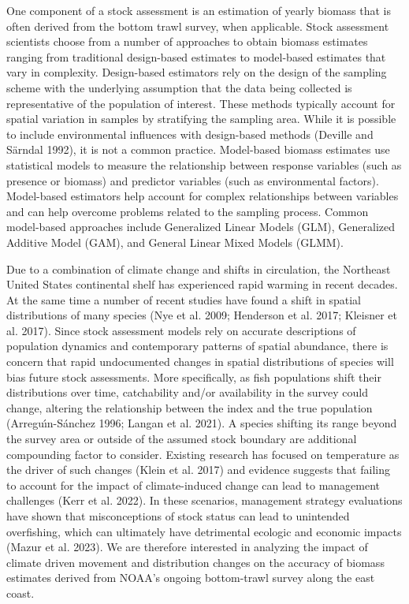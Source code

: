 \documentclass[
  12pt,
]{article}
\begin{document}
One component of a stock assessment is an estimation of yearly biomass that is often derived from the bottom trawl survey, when applicable. Stock assessment scientists choose from a number of approaches to obtain biomass estimates ranging from traditional design-based estimates to model-based estimates that vary in complexity. Design-based estimators rely on the design of the sampling scheme with the underlying assumption that the data being collected is representative of the population of interest. These methods typically account for spatial variation in samples by stratifying the sampling area. While it is possible to include environmental influences with design-based methods (Deville and Särndal 1992), it is not a common practice. Model-based biomass estimates use statistical models to measure the relationship between response variables (such as presence or biomass) and predictor variables (such as environmental factors). Model-based estimators help account for complex relationships between variables and can help overcome problems related to the sampling process. Common model-based approaches include Generalized Linear Models (GLM), Generalized Additive Model (GAM), and General Linear Mixed Models (GLMM).

Due to a combination of climate change and shifts in circulation, the Northeast United States continental shelf has experienced rapid warming in recent decades. At the same time a number of recent studies have found a shift in spatial distributions of many species (Nye et al. 2009; Henderson et al. 2017; Kleisner et al. 2017). Since stock assessment models rely on accurate descriptions of population dynamics and contemporary patterns of spatial abundance, there is concern that rapid undocumented changes in spatial distributions of species will bias future stock assessments. More specifically, as fish populations shift their distributions over time, catchability and/or availability in the survey could change, altering the relationship between the index and the true population (Arreguı́n-Sánchez 1996; Langan et al. 2021). A species shifting its range beyond the survey area or outside of the assumed stock boundary are additional compounding factor to consider. Existing research has focused on temperature as the driver of such changes (Klein et al. 2017) and evidence suggests that failing to account for the impact of climate-induced change can lead to management challenges (Kerr et al. 2022). In these scenarios, management strategy evaluations have shown that misconceptions of stock status can lead to unintended overfishing, which can ultimately have detrimental ecologic and economic impacts (Mazur et al. 2023). We are therefore interested in analyzing the impact of climate driven movement and distribution changes on the accuracy of biomass estimates derived from NOAA's ongoing bottom-trawl survey along the east coast.
\end{document}

